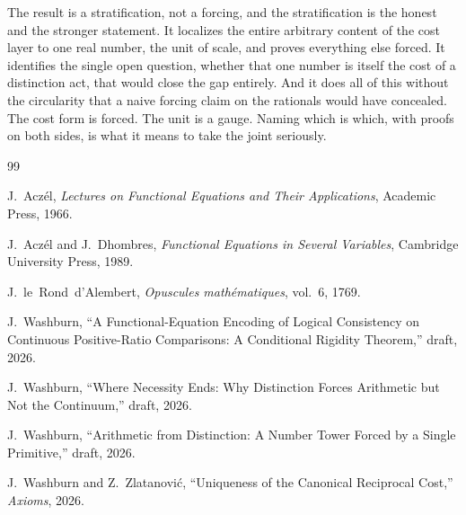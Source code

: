\documentclass[11pt,a4paper]{article}
\theoremstyle{definition}
\theoremstyle{remark}
\begin{document}
The result is a stratification, not a forcing, and the stratification is the
honest and the stronger statement. It localizes the entire arbitrary content of
the cost layer to one real number, the unit of scale, and proves everything else
forced. It identifies the single open question, whether that one number is itself
the cost of a distinction act, that would close the gap entirely. And it does all
of this without the circularity that a naive forcing claim on the rationals would
have concealed. The cost form is forced. The unit is a gauge. Naming which is
which, with proofs on both sides, is what it means to take the joint seriously.

\begin{thebibliography}{99}

J.~Acz\'el,
\emph{Lectures on Functional Equations and Their Applications},
Academic Press, 1966.

J.~Acz\'el and J.~Dhombres,
\emph{Functional Equations in Several Variables},
Cambridge University Press, 1989.

J.~le~Rond~d'Alembert,
\emph{Opuscules math\'ematiques}, vol.~6, 1769.

J.~Washburn,
``A Functional-Equation Encoding of Logical Consistency on Continuous
Positive-Ratio Comparisons: A Conditional Rigidity Theorem,'' draft, 2026.

J.~Washburn,
``Where Necessity Ends: Why Distinction Forces Arithmetic but Not the
Continuum,'' draft, 2026.

J.~Washburn,
``Arithmetic from Distinction: A Number Tower Forced by a Single Primitive,''
draft, 2026.

J.~Washburn and Z.~Zlatanovi\'c,
``Uniqueness of the Canonical Reciprocal Cost,''
\emph{Axioms}, 2026.

\end{thebibliography}
\end{document}
